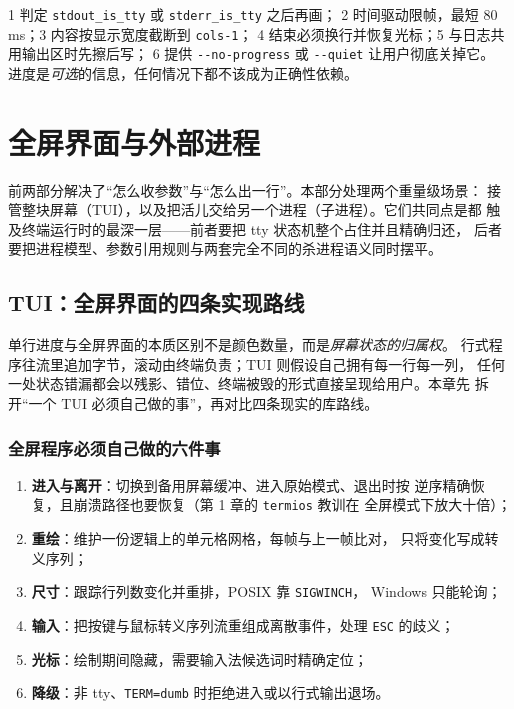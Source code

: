\documentclass[12pt,a4paper,fontset=fandol]{ctexbook}
\newcommand{\Tp}[1]{\texttt{#1}}
\newcommand{\Opt}[1]{\texttt{-\/-#1}}
\begin{document}
\begin{bestpractice}[title={进度的六条实现纪律}]
1 判定 \Tp{stdout\_is\_tty} 或 \Tp{stderr\_is\_tty} 之后再画；
2 时间驱动限帧，最短 80 ms；3 内容按显示宽度截断到 \Tp{cols-1}；
4 结束必须换行并恢复光标；5 与日志共用输出区时先擦后写；
6 提供 \Opt{no-progress} 或 \Opt{quiet} 让用户彻底关掉它。
进度是\emph{可选}的信息，任何情况下都不该成为正确性依赖。
\end{bestpractice}

\part{全屏界面与外部进程}

前两部分解决了``怎么收参数''与``怎么出一行''。本部分处理两个重量级场景：
接管整块屏幕（TUI），以及把活儿交给另一个进程（子进程）。它们共同点是都
触及终端运行时的最深一层——前者要把 tty 状态机整个占住并且精确归还，
后者要把进程模型、参数引用规则与两套完全不同的杀进程语义同时摆平。

\chapter{TUI：全屏界面的四条实现路线}

单行进度与全屏界面的本质区别不是颜色数量，而是\emph{屏幕状态的归属权}。
行式程序往流里追加字节，滚动由终端负责；TUI 则假设自己拥有每一行每一列，
任何一处状态错漏都会以残影、错位、终端被毁的形式直接呈现给用户。本章先
拆开``一个 TUI 必须自己做的事''，再对比四条现实的库路线。

\section{全屏程序必须自己做的六件事}

\begin{enumerate}
\item \textbf{进入与离开}：切换到备用屏幕缓冲、进入原始模式、退出时按
      逆序精确恢复，且崩溃路径也要恢复（第 1 章的 \Tp{termios} 教训在
      全屏模式下放大十倍）；
\item \textbf{重绘}：维护一份逻辑上的单元格网格，每帧与上一帧比对，
      只将变化写成转义序列；
\item \textbf{尺寸}：跟踪行列数变化并重排，POSIX 靠 \Tp{SIGWINCH}，
      Windows 只能轮询；
\item \textbf{输入}：把按键与鼠标转义序列流重组成离散事件，处理
      \Tp{ESC} 的歧义；
\item \textbf{光标}：绘制期间隐藏，需要输入法候选词时精确定位；
\item \textbf{降级}：非 tty、\Tp{TERM=dumb} 时拒绝进入或以行式输出退场。
\end{enumerate}
\end{document}
